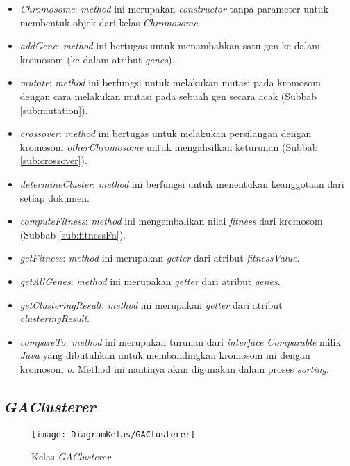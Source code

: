 \begin{itemize}
	\item \textit{Chromosome}: \textit{method} ini merupakan \textit{constructor} tanpa parameter untuk membentuk objek dari kelas \textit{Chromosome}.
	\item \textit{addGene}: \textit{method} ini bertugas untuk menambahkan satu gen ke dalam kromosom (ke dalam atribut \textit{genes}).
	\item \textit{mutate}: \textit{method} ini berfungsi untuk melakukan mutasi pada kromosom dengan cara melakukan mutasi pada sebuah gen secara acak (Subbab \ref{sub:mutation}).
	\item \textit{crossover}: \textit{method} ini bertugas untuk melakukan persilangan dengan kromosom \textit{otherChromosome} untuk mengahsilkan keturunan (Subbab \ref{sub:crossover}).
	\item \textit{determineCluster}: \textit{method} ini berfungsi untuk menentukan keanggotaan dari setiap dokumen.
	\item \textit{computeFitness}: \textit{method} ini mengembalikan nilai \textit{fitness} dari kromosom (Subbab \ref{sub:fitnessFn}).
	\item \textit{getFitness}: \textit{method} ini merupakan \textit{getter} dari atribut \textit{fitnessValue}.
	\item \textit{getAllGenes}: \textit{method} ini merupakan \textit{getter} dari atribut \textit{genes}.
	\item \textit{getClusteringResult}: \textit{method} ini merupakan \textit{getter} dari atribut \textit{clusteringResult}.
	\item \textit{compareTo}: \textit{method} ini merupakan turunan dari \textit{interface Comparable} milik \textit{Java} yang dibutuhkan untuk membandingkan kromosom ini dengan kromosom \textit{o}. Method ini nantinya akan digunakan dalam proses \textit{sorting}.
\end{itemize}

\subsection{\textit{GAClusterer}}

\begin{figure}[H]
	\begin{center}
		\texttt{[image: DiagramKelas/GAClusterer]}
		\caption{Kelas \textit{GAClusterer}}
		\label{fig:kelasGAClusterer}
	\end{center}
\end{figure}


